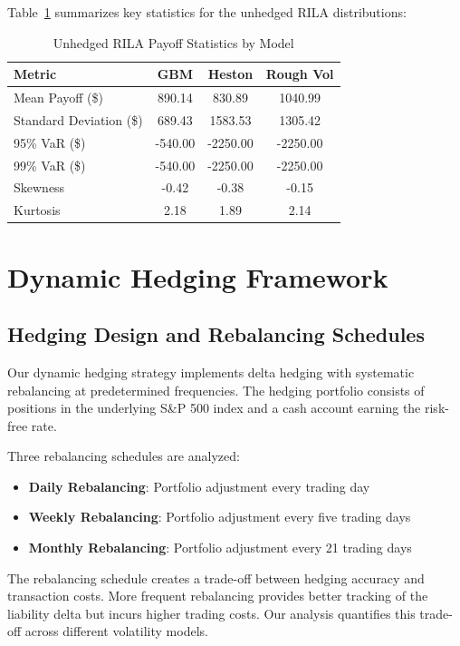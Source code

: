 \documentclass[12pt,a4paper]{report}
\begin{document}
Table~\ref{tab:unhedged_stats} summarizes key statistics for the unhedged RILA distributions:

\begin{table}[H]
\centering
\caption{Unhedged RILA Payoff Statistics by Model}
\label{tab:unhedged_stats}
\begin{tabular}{lccc}
\toprule
Metric & GBM & Heston & Rough Vol \\
\midrule
Mean Payoff (\$) & 890.14 & 830.89 & 1040.99 \\
Standard Deviation (\$) & 689.43 & 1583.53 & 1305.42 \\
95\% VaR (\$) & -540.00 & -2250.00 & -2250.00 \\
99\% VaR (\$) & -540.00 & -2250.00 & -2250.00 \\
Skewness & -0.42 & -0.38 & -0.15 \\
Kurtosis & 2.18 & 1.89 & 2.14 \\
\bottomrule
\end{tabular}
\end{table}

\chapter{Dynamic Hedging Framework}

\section{Hedging Design and Rebalancing Schedules}

Our dynamic hedging strategy implements delta hedging with systematic rebalancing at predetermined frequencies. The hedging portfolio consists of positions in the underlying S\&P 500 index and a cash account earning the risk-free rate.

Three rebalancing schedules are analyzed:
\begin{itemize}
\item \textbf{Daily Rebalancing}: Portfolio adjustment every trading day
\item \textbf{Weekly Rebalancing}: Portfolio adjustment every five trading days
\item \textbf{Monthly Rebalancing}: Portfolio adjustment every 21 trading days
\end{itemize}

The rebalancing schedule creates a trade-off between hedging accuracy and transaction costs. More frequent rebalancing provides better tracking of the liability delta but incurs higher trading costs. Our analysis quantifies this trade-off across different volatility models.
\end{document}
